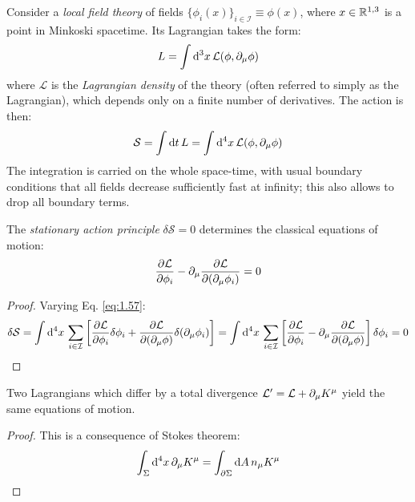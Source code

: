 Consider a \textit{local field theory} of fields $ \{\phi_i(x)\}_{i \in \mathcal{I}} \equiv \phi(x) $, where $ x \in \mathbb{R}^{1,3} $ is a point in Minkoski spacetime. Its Lagrangian takes the form:
\begin{equation}
  L = \int \mathrm{d}^3 x\, \mathcal{L}(\phi, \partial_\mu \phi)
  \label{eq:1.56}
\end{equation}
where $ \mathcal{L} $ is the \textit{Lagrangian density} of the theory (often referred to simply as the Lagrangian), which depends only on a finite number of derivatives. The action is then:
\begin{equation}
  \mathcal{S} = \int \mathrm{d} t\, L = \int \mathrm{d}^4 x\, \mathcal{L}(\phi, \partial_\mu \phi)
  \label{eq:1.57}
\end{equation}
The integration is carried on the whole space-time, with usual boundary conditions that all fields decrease sufficiently fast at infinity; this also allows to drop all boundary terms.

\begin{theorem}{}{}
  The \textit{stationary action principle} $ \delta \mathcal{S} = 0 $ determines the classical equations of motion:
  \begin{equation}
    \frac{\partial \mathcal{L}}{\partial \phi_i} - \partial_\mu \frac{\partial \mathcal{L}}{\partial (\partial_\mu \phi_i)} = 0
    \label{eq:1.58}
  \end{equation}

  \tcblower

  \begin{proof}
    Varying Eq. \ref{eq:1.57}:
    \begin{equation*}
      \delta \mathcal{S} = \int \mathrm{d}^4 x\, \sum_{i \in \mathcal{I}} \left[ \frac{\partial \mathcal{L}}{\partial \phi_i} \delta \phi_i + \frac{\partial \mathcal{L}}{\partial (\partial_\mu \phi)} \delta (\partial_\mu \phi_i) \right] = \int \mathrm{d}^4 x\, \sum_{i \in \mathcal{I}} \left[ \frac{\partial \mathcal{L}}{\partial \phi_i} - \partial_\mu \frac{\partial \mathcal{L}}{\partial (\partial_\mu \phi)} \right] \delta \phi_i = 0
    \end{equation*}
  \end{proof}
\end{theorem}

\begin{corollary}{}{}
  Two Lagrangians which differ by a total divergence $ \mathcal{L}' = \mathcal{L} + \partial_\mu K^\mu $ yield the same equations of motion.

  \tcblower

  \begin{proof}
    This is a consequence of Stokes theorem:
    \begin{equation*}
      \int_\Sigma \mathrm{d}^4 x\, \partial_\mu K^\mu = \int_{\partial \Sigma} \mathrm{d} A\, n_\mu K^\mu
    \end{equation*}
  \end{proof}
\end{corollary}

